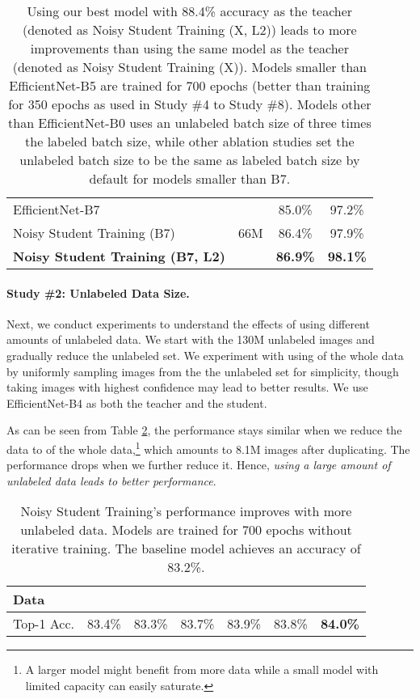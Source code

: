 \documentclass[10pt,twocolumn,letterpaper]{article}
\begin{document}
\begin{table}[h!]
\begin{tabular}{l|c|cc}
         \midrule
         EfficientNet-B7 & \multirow{3}{*}{66M} & 85.0\% & 97.2\%  \\
         Noisy Student Training (B7) & & 86.4\% & 97.9\% \\
         \bf Noisy Student Training (B7, L2) & & \bf 86.9\% & \bf 98.1\% \\
         \bottomrule
    \end{tabular}
    \caption{Using our best model with 88.4\% accuracy as the teacher (denoted as Noisy Student Training (X, L2)) leads to more improvements than using the same model as the teacher (denoted as Noisy Student Training (X)).
    Models smaller than EfficientNet-B5 are trained for 700 epochs (better than training for 350 epochs as used in Study \#4 to Study \#8).
     Models other than EfficientNet-B0 uses an unlabeled batch size of three times the labeled batch size, while other ablation studies set the unlabeled batch size to be the same as labeled batch size by default for models smaller than B7. }
    \label{tab:vary_model_size}
\end{table}


\paragraph{Study \#2: Unlabeled Data Size.}
Next, we conduct experiments to understand the effects of using different amounts of unlabeled data. We start with the 130M unlabeled images and gradually reduce the unlabeled set. We experiment with using  of the whole data by uniformly sampling images from the the unlabeled set for simplicity, though taking images with highest confidence may lead to better results. We use EfficientNet-B4 as both the teacher and the student. 

As can be seen from Table \ref{tab:vary_unlabeled_data}, the performance stays similar when we reduce the data to  of the whole data,\footnote{A larger model might benefit from more data while a small model with limited capacity can easily saturate.}  which amounts to 8.1M images after duplicating. The performance drops when we further reduce it. Hence, \emph{using a large amount of unlabeled data leads to better performance}.

\begin{table}[h!]
\footnotesize
    \centering
    \begin{tabular}{l|cccccc}
    \toprule
    Data &  &  &  &  &  &  \\
    \midrule
    Top-1 Acc. &83.4\% & 83.3\% & 83.7\% & 83.9\% & 83.8\% & \bf 84.0\% \\
    \bottomrule
    \end{tabular}
    \caption{Noisy Student Training's performance improves with more unlabeled data. Models are trained for 700 epochs without iterative training. The baseline model achieves an accuracy of 83.2\%.}
    \label{tab:vary_unlabeled_data}
\end{table}
\end{document}
